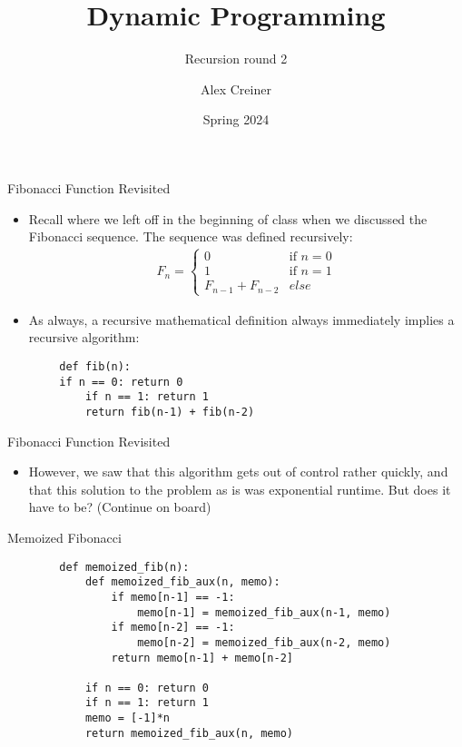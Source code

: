 \documentclass{beamer}
\title{Dynamic Programming}
\subtitle{Recursion round 2}
\author{Alex Creiner}
\institute{Boston College}
\date{Spring 2024}
\begin{document}
\titlepage
\begin{frame}[fragile]{Fibonacci Function Revisited}
    \begin{itemize}
        \item Recall where we left off in the beginning of class when we discussed the Fibonacci sequence. The sequence was defined recursively:
        \begin{align*}
            F_{n}= \begin{cases} 0 & \textrm{if } n = 0 \\ 1 & \textrm{if } n = 1 \\ F_{n-1} + F_{n-2} & else \end{cases} 
        \end{align*}
        \item As always, a recursive mathematical definition always immediately implies a recursive algorithm:
    \end{itemize}
    \begin{verbatim}
        def fib(n):
	    if n == 0: return 0
            if n == 1: return 1
            return fib(n-1) + fib(n-2)
    \end{verbatim}
\end{frame}

\begin{frame}{Fibonacci Function Revisited}
    \begin{itemize}
        \item However, we saw that this algorithm gets out of control rather quickly, and that this solution to the problem as is was exponential runtime. But does it have to be? (Continue on board) \pause 
    \end{itemize}
\end{frame}

\begin{frame}[fragile]{Memoized Fibonacci}
    \begin{verbatim}
        def memoized_fib(n):
            def memoized_fib_aux(n, memo):
                if memo[n-1] == -1:
                    memo[n-1] = memoized_fib_aux(n-1, memo)
                if memo[n-2] == -1:
                    memo[n-2] = memoized_fib_aux(n-2, memo)
                return memo[n-1] + memo[n-2]

            if n == 0: return 0
            if n == 1: return 1
            memo = [-1]*n 
            return memoized_fib_aux(n, memo)
    \end{verbatim}
\end{frame}
\end{document}
